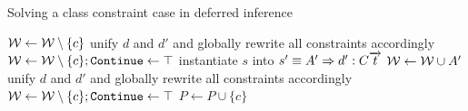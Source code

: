 \begin{algorithm}
    \caption{Solving a class constraint case in deferred inference}
    \label{case_class}
    \begin{algorithmic}
            \State $\mathcal W \gets \mathcal W \setminus \{c\}$ 
            \State unify $d$ and $d'$ and globally rewrite all constraints accordingly
            \State $\mathcal W \gets \mathcal W \setminus \{c\}; \mathtt{Continue} \gets \top$ 
            \State instantiate $s$ into $s' \equiv A' \Rightarrow d' : C \overrightarrow{t}$
            \State $\mathcal{W} \gets \mathcal{W} \cup A'$ 
            \State unify $d$ and $d'$ and globally rewrite all constraints accordingly
            \State $\mathcal W \gets \mathcal W \setminus \{c\}; \mathtt{Continue} \gets \top$ 
        \Else
            \State $P \gets P \cup \{c\}$ 
        \EndIf
    \end{algorithmic}
\end{algorithm}

